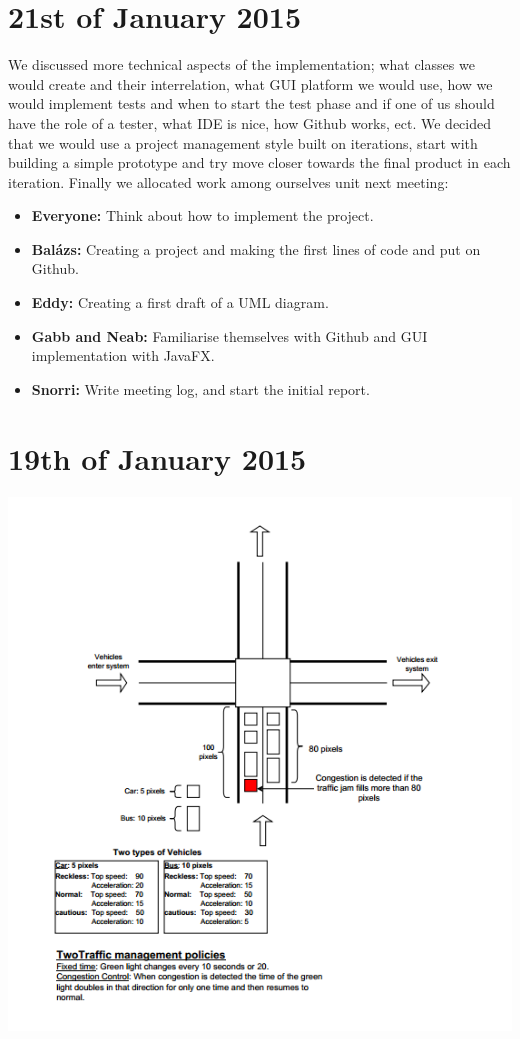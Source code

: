 \documentclass[11pt]{article}
\begin{document}
\section{21st of January 2015}
We discussed more technical aspects of the implementation; what classes we would create and their interrelation, what GUI platform we would use, how we would implement tests and when to start the test phase and if one of us should have the role of a tester, what IDE is nice, how Github works, ect. We decided that we would use a project management style built on iterations, start with building a simple prototype and try move closer towards the final product in each iteration. Finally we allocated work among ourselves unit next meeting:
\begin{itemize}
\item \textbf{Everyone:} Think about how to implement the project.

\item \textbf{Balázs:} Creating a project and making the first lines of code and put on Github.

\item \textbf{Eddy:} Creating a first draft of a UML diagram.

\item \textbf{Gabb and Neab:} Familiarise themselves with Github and GUI implementation with JavaFX.

\item \textbf{Snorri:} Write meeting log, and start the initial report.

\end{itemize} 

\newpage

\section{19th of January 2015}
\includegraphics{meeting2}
\newpage
\end{document}
